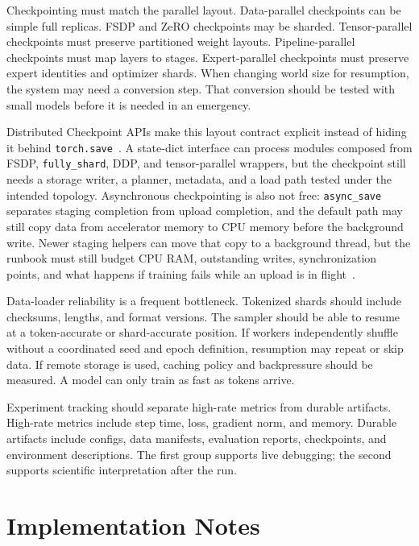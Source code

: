 Checkpointing must match the parallel layout. Data-parallel checkpoints can be simple full replicas. FSDP and ZeRO checkpoints may be sharded. Tensor-parallel checkpoints must preserve partitioned weight layouts. Pipeline-parallel checkpoints must map layers to stages. Expert-parallel checkpoints must preserve expert identities and optimizer shards. When changing world size for resumption, the system may need a conversion step. That conversion should be tested with small models before it is needed in an emergency.

Distributed Checkpoint APIs make this layout contract explicit instead of hiding it behind \texttt{torch.save}~\cite{pytorch2026distributedcheckpoint}. A state-dict interface can process modules composed from FSDP, \texttt{fully\_shard}, DDP, and tensor-parallel wrappers, but the checkpoint still needs a storage writer, a planner, metadata, and a load path tested under the intended topology. Asynchronous checkpointing is also not free: \texttt{async\_save} separates staging completion from upload completion, and the default path may still copy data from accelerator memory to CPU memory before the background write. Newer staging helpers can move that copy to a background thread, but the runbook must still budget CPU RAM, outstanding writes, synchronization points, and what happens if training fails while an upload is in flight~\cite{pytorch2026asynccheckpoint}.

Data-loader reliability is a frequent bottleneck. Tokenized shards should include checksums, lengths, and format versions. The sampler should be able to resume at a token-accurate or shard-accurate position. If workers independently shuffle without a coordinated seed and epoch definition, resumption may repeat or skip data. If remote storage is used, caching policy and backpressure should be measured. A model can only train as fast as tokens arrive.

Experiment tracking should separate high-rate metrics from durable artifacts. High-rate metrics include step time, loss, gradient norm, and memory. Durable artifacts include configs, data manifests, evaluation reports, checkpoints, and environment descriptions. The first group supports live debugging; the second supports scientific interpretation after the run.

\section{Implementation Notes}
\label{sec:distributed-implementation-notes}

